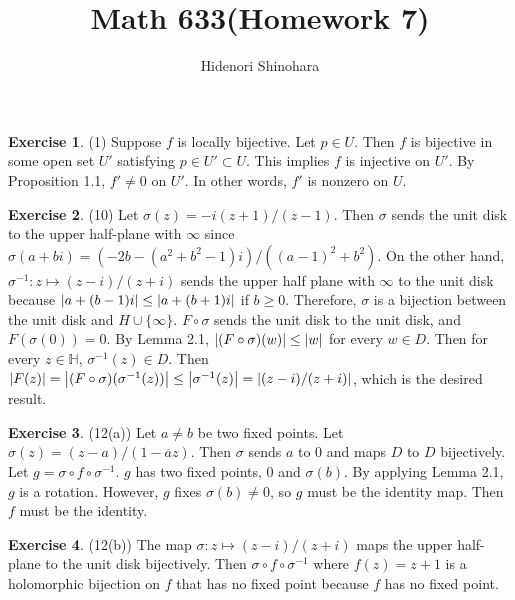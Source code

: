 \documentclass[12pt, psamsfonts]{amsart}
\theoremstyle{definition}
\newtheorem*{exer}{Exercise}
\theoremstyle{remark}
\numberwithin{equation}{section}
\begin{document}
\title{Math 633(Homework 7)}
\author{Hidenori Shinohara}
\maketitle

\begin{exer}{(1)}
  Suppose $f$ is locally bijective.
  Let $p \in U$.
  Then $f$ is bijective in some open set $U'$ satisfying $p \in U' \subset U$.
  This implies $f$ is injective on $U'$.
  By Proposition 1.1, $f' \ne 0$ on $U'$.
  In other words, $f'$ is nonzero on $U$.
\end{exer}

\begin{exer}{(10)}
  Let $\sigma(z) = -i(z + 1) / (z - 1)$.
  Then $\sigma$ sends the unit disk to the upper half-plane with $\infty$ since
  $\sigma(a + bi) = (-2b - (a^2 + b^2 - 1)i) / ((a - 1)^2 + b^2)$.
  On the other hand, $\sigma^{-1}: z \mapsto (z - i) / (z + i)$ sends the upper half plane with $\infty$ to the unit disk because $\abs{a + (b - 1)i} \leq \abs{a + (b + 1)i}$ if $b \geq 0$.
  Therefore, $\sigma$ is a bijection between the unit disk and $H \cup \{ \infty \}$.
  $F \circ \sigma$ sends the unit disk to the unit disk, and $F(\sigma(0)) = 0$.
  By Lemma 2.1, $\abs{(F \circ \sigma)(w)} \leq \abs{w}$ for every $w \in D$.
  Then for every $z \in \mathbb{H}$, $\sigma^{-1}(z) \in D$.
  Then $\abs{F(z)} = \abs{(F \circ \sigma)(\sigma^{-1}(z))} \leq \abs{\sigma^{-1}(z)} = \abs{(z - i) / (z + i)}$, which is the desired result.
\end{exer}

\begin{exer}{(12(a))}
  Let $a \ne b$ be two fixed points.
  Let $\sigma(z) = (z - a) / (1 - \overline{a}z)$.
  Then $\sigma$ sends $a$ to $0$ and maps $D$ to $D$ bijectively.
  Let $g = \sigma \circ f \circ \sigma^{-1}$.
  $g$ has two fixed points, 0 and $\sigma(b)$.
  By applying Lemma 2.1, $g$ is a rotation.
  However, $g$ fixes $\sigma(b) \ne 0$, so $g$ must be the identity map.
  Then $f$ must be the identity.
\end{exer}

\begin{exer}{(12(b))}
  The map $\sigma: z \mapsto (z - i) / (z + i)$ maps the upper half-plane to the unit disk bijectively.
  Then $\sigma \circ f \circ \sigma^{-1}$ where $f(z) = z + 1$ is a holomorphic bijection on $f$ that has no fixed point because $f$ has no fixed point.
\end{exer}
\end{document}
